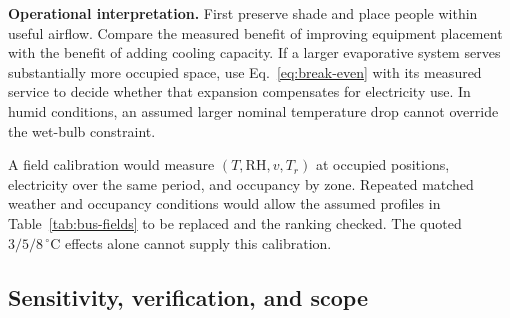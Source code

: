 \documentclass[12pt]{article}
\begin{document}
\noindent\textbf{Operational interpretation.} First preserve shade and place people within useful airflow. Compare the measured benefit of improving equipment placement with the benefit of adding cooling capacity. If a larger evaporative system serves substantially more occupied space, use Eq.~\eqref{eq:break-even} with its measured service to decide whether that expansion compensates for electricity use. In humid conditions, an assumed larger nominal temperature drop cannot override the wet-bulb constraint.

A field calibration would measure $(T,\mathrm{RH},v,T_r)$ at occupied positions, electricity over the same period, and occupancy by zone. Repeated matched weather and occupancy conditions would allow the assumed profiles in Table~\ref{tab:bus-fields} to be replaced and the ranking checked. The quoted $3/5/8\,^{\circ}\mathrm C$ effects alone cannot supply this calibration.

\clearpage
\subsection{Sensitivity, verification, and scope}
\end{document}

